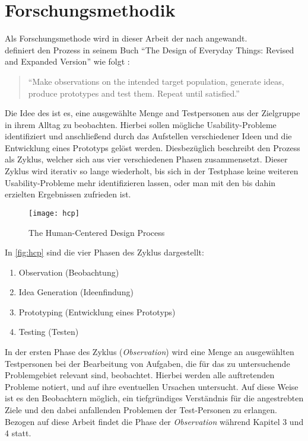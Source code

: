 \chapter{Forschungsmethodik}
Als Forschungsmethode wird in dieser Arbeit der \hcdp{} nach \citeauthor{Norman13} angewandt. \\
\citeauthor{Norman13} definiert den Prozess in seinem Buch ``The Design of Everyday Things: Revised and Expanded Version'' wie folgt \citep[Abbildung 6.2]{Norman13}:

\begin{quote}
  ``Make observations on the intended target population, generate ideas, produce prototypes and test them.
  Repeat until satisfied.''
\end{quote}

\noindent
Die Idee des \hcdp{} ist es, eine ausgewählte Menge and Testpersonen aus der Zielgruppe in ihrem Alltag zu beobachten.
Hierbei sollen mögliche Usability-Probleme identifiziert und anschließend durch das Aufstellen verschiedener Ideen und die Entwicklung eines Prototyps gelöst werden.
Diesbezüglich beschreibt \citeauthor{Norman13} den Prozess als Zyklus, welcher sich aus vier verschiedenen Phasen zusammensetzt.
Dieser Zyklus wird iterativ so lange wiederholt, bis sich in der Testphase keine weiteren Usability-Probleme mehr identifizieren lassen, oder man mit den bis dahin erzielten Ergebnissen zufrieden ist. \\

\begin{figure}[h]
  \centering
  \texttt{[image: hcp]}
  \caption{The Human-Centered Design Process}
  \label{fig:hcp}
\end{figure}

\noindent
In \autoref{fig:hcp} sind die vier Phasen des Zyklus dargestellt:
\begin{enumerate}
  \item Observation (Beobachtung) \label{itm:observation}
  \item Idea Generation (Ideenfindung) \label{itm:idea}
  \item Prototyping (Entwicklung eines Prototyps) \label{itm:prototyping}
  \item Testing (Testen) \label{itm:testing}
\end{enumerate}

\noindent
In der ersten Phase des Zyklus (\emph{Observation}) wird eine Menge an ausgewählten Testpersonen bei der Bearbeitung von Aufgaben, die für das zu untersuchende Problemgebiet relevant sind, beobachtet.
Hierbei werden alle auftretenden Probleme notiert, und auf ihre eventuellen Ursachen untersucht.
Auf diese Weise ist es den Beobachtern möglich, ein tiefgründiges Verständnis für die angestrebten Ziele und den dabei anfallenden Problemen der Test-Personen zu erlangen.
Bezogen auf diese Arbeit findet die Phase der \emph{Observation} während Kapitel 3 und 4 statt. \\

